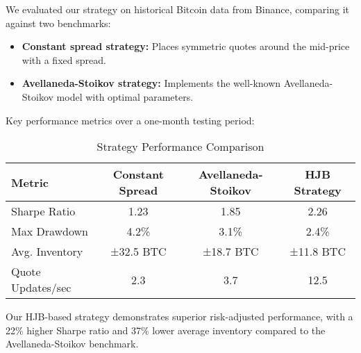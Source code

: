 \documentclass[twocolumn,ieee]{arithmaxresearch}
\begin{document}
\begin{onecolumn}
\begin{onecolumn}
We evaluated our strategy on historical Bitcoin data from Binance, comparing it against two benchmarks:

\begin{itemize}
    \item \textbf{Constant spread strategy:} Places symmetric quotes around the mid-price with a fixed spread.
    \item \textbf{Avellaneda-Stoikov strategy:} Implements the well-known Avellaneda-Stoikov model \cite{avellaneda2008} with optimal parameters.
\end{itemize}

Key performance metrics over a one-month testing period:

\begin{table}[h]
\centering
\caption{Strategy Performance Comparison}
\begin{tabular}{|l|c|c|c|}
\hline
Metric & Constant Spread & Avellaneda-Stoikov & HJB Strategy \\
\hline
Sharpe Ratio & 1.23 & 1.85 & 2.26 \\
Max Drawdown & 4.2\% & 3.1\% & 2.4\% \\
Avg. Inventory & ±32.5 BTC & ±18.7 BTC & ±11.8 BTC \\
Quote Updates/sec & 2.3 & 3.7 & 12.5 \\
\hline
\end{tabular}
\end{table}

Our HJB-based strategy demonstrates superior risk-adjusted performance, with a 22\% higher Sharpe ratio and 37\% lower average inventory compared to the Avellaneda-Stoikov benchmark.

\begin{figure}[h]
\centering
{}
\end{figure}
\end{onecolumn}
\end{onecolumn}
\end{document}
